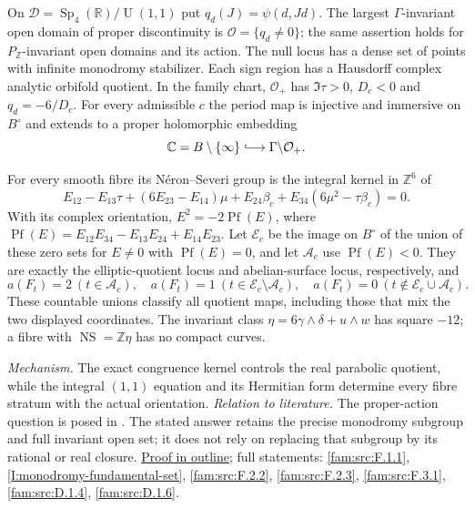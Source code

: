 \documentclass[11pt,a4paper]{article}
\theoremstyle{definition}
\newcommand{\C}{\mathbb C}\newcommand{\R}{\mathbb R}\newcommand{\Z}{\mathbb Z}\newcommand{\Q}{\mathbb Q}\newcommand{\N}{\mathbb N}\newcommand{\F}{\mathbb F}
\begin{document}
On $\mathcal D=\operatorname{Sp}_4(\R)/\operatorname U(1,1)$ put
$q_d(J)=\psi(d,Jd)$.  The largest $\Gamma$-invariant open domain
of proper discontinuity is $\mathcal O=\{q_d\ne0\}$;
the same assertion holds for $P_\Z$-invariant open domains and
its action.  The null locus has a dense set of
points with infinite monodromy stabilizer.  Each sign region has
a Hausdorff complex analytic orbifold quotient.  In the family
chart, $\mathcal O_+$ has $\Im\tau>0$, $D_c<0$ and
$q_d=-6/D_c$.  For every admissible $c$ the period map is
injective and immersive on $B^\circ$ and extends to a proper
holomorphic embedding
\[
 \C=B\setminus\{\infty\}\lhook\joinrel\longrightarrow
 \Gamma\backslash\mathcal O_+.
\]

For every smooth fibre its N\'eron--Severi group is the integral
kernel in $\Z^6$ of
\[
 E_{12}-E_{13}\tau+(6E_{23}-E_{14})\mu+E_{24}\beta_c
             +E_{34}(6\mu^2-\tau\beta_c)=0.
\]
With its complex orientation,
$E^2=-2\operatorname{Pf}(E)$, where
$\operatorname{Pf}(E)=E_{12}E_{34}-E_{13}E_{24}+E_{14}E_{23}$.
Let $\mathcal E_c$ be the image on $B^\circ$ of the union of
these zero sets for $E\ne0$ with $\operatorname{Pf}(E)=0$,
and let $\mathcal A_c$ use $\operatorname{Pf}(E)<0$.
They are exactly the elliptic-quotient locus and abelian-surface
locus, respectively, and
\[
 a(F_t)=2\ (t\in\mathcal A_c),\quad
 a(F_t)=1\ (t\in\mathcal E_c\setminus\mathcal A_c),\quad
 a(F_t)=0\ (t\notin\mathcal E_c\cup\mathcal A_c).
\]
These countable unions classify all quotient maps, including
those that mix the two displayed coordinates.  The invariant
class $\eta=6\gamma\wedge\delta+u\wedge w$ has square $-12$;
a fibre with $\operatorname{NS}=\Z\eta$ has no compact curves.

\textit{Mechanism.} The exact congruence kernel controls the real
parabolic quotient, while the integral $(1,1)$ equation and its
Hermitian form determine every fibre stratum with the actual
orientation.
\textit{Relation to literature.} The proper-action question is
posed in \cite[Remark~8.4, pp.~23--24]{Engel2026}.  The stated
answer retains the precise monodromy subgroup and full invariant
open set; it does not rely on replacing that subgroup by its
rational or real closure.
\hyperlink{outline-I-C}{Proof in outline}; full statements:
\ref{fam:src:F.1.1}, \ref{I:monodromy-fundamental-set},
\ref{fam:src:F.2.2}, \ref{fam:src:F.2.3}, \ref{fam:src:F.3.1},
\ref{fam:src:D.1.4}, \ref{fam:src:D.1.6}.

\hypertarget{main-I-D}{}
\end{document}
